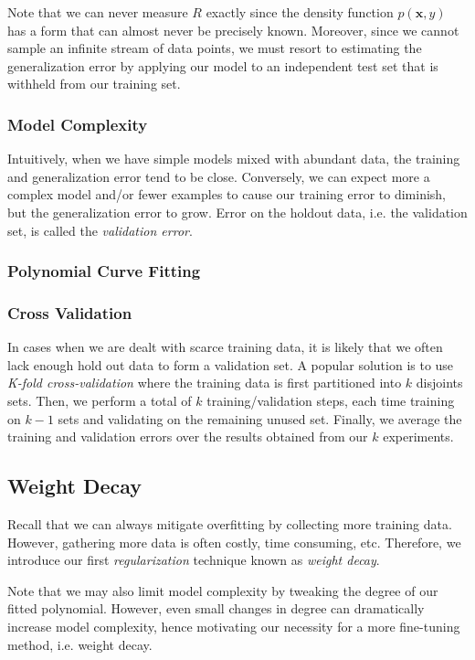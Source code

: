 \documentclass[a4paper,12pt]{article}
\theoremstyle{definition}
\begin{document}
Note that we can never measure $R$ exactly since the density function $p(\mathbf{x},y)$ has a form that can almost never
be precisely known. Moreover, since we cannot sample an infinite stream of data points, we must resort to estimating
the generalization error by applying our model to an independent test set that is withheld from our training set.
\subsubsection*{Model Complexity}
Intuitively, when we have simple models mixed with abundant data, the training and generalization error tend to be close.
Conversely, we can expect more a complex model and/or fewer examples to cause our training error to diminish, but the
generalization error to grow. Error on the holdout data, i.e. the validation set, is called the \textit{validation error}.

\subsubsection*{Polynomial Curve Fitting}
\subsubsection*{Cross Validation}
In cases when we are dealt with scarce training data, it is likely that we often lack enough hold out data to form a validation
set. A popular solution is to use \textit{K-fold cross-validation} where the training data is first partitioned into $k$ disjoints
sets. Then, we perform a total of $k$ training/validation steps, each time training on $k-1$ sets and validating on the remaining unused set.
Finally, we average the training and validation errors over the results obtained from our $k$ experiments.
\subsection*{Weight Decay}
Recall that we can always mitigate overfitting by collecting more training data. However, gathering more data is often costly, time consuming,
etc. Therefore, we introduce our first \textit{regularization} technique known as \textit{weight decay}.

Note that we may also limit model complexity by tweaking the degree of our fitted polynomial. However, even small
changes in degree can dramatically increase model complexity, hence motivating our necessity for a more fine-tuning method, i.e. weight decay.
\end{document}
